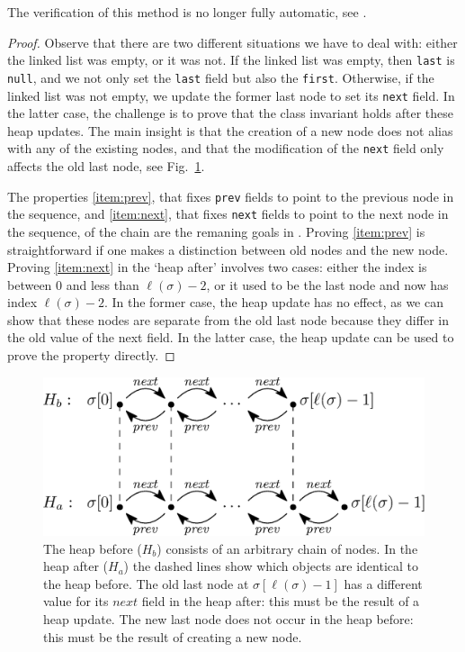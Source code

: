 \documentclass[runningheads]{llncs}
\begin{document}


The verification of this method is no longer fully automatic, see .

\begin{proof}
Observe that there are two different situations we have to deal with: either the linked list was empty, or it was not. If the linked list was empty, then \texttt{last} is \texttt{null}, and we not only set the \texttt{last} field but also the \texttt{first}. Otherwise, if the linked list was not empty, we update the former last node to set its \texttt{next} field. In the latter case, the challenge is to prove that the class invariant holds after these heap updates. The main insight is that the creation of a new node does not alias with any of the existing nodes, and that the modification of the \texttt{next} field only affects the old last node, see Fig.~\ref{fig:linklast}.

The properties \ref{item:prev}, that fixes \texttt{prev} fields to point to the previous node in the sequence, and \ref{item:next}, that fixes \texttt{next} fields to point to the next node in the sequence, of the chain are the remaning goals in . Proving \ref{item:prev} is straightforward if one makes a distinction between old nodes and the new node. Proving \ref{item:next} in the `heap after' involves two cases: either the index is between $0$ and less than $\ell(\sigma)-2$, or it used to be the last node and now has index $\ell(\sigma)-2$. In the former case, the heap update has no effect, as we can show that these nodes are separate from the old last node because they differ in the old value of the next field. In the latter case, the heap update can be used to prove the property directly.
\end{proof}

\begin{figure}
   \centering
   \includegraphics[scale=0.4]{figures/linkedlist-linklast.eps}
   \caption{The heap before ($H_b$) consists of an arbitrary chain of nodes. In the heap after ($H_a$) the dashed lines show which objects are identical to the heap before. The old last node at $\sigma[\ell(\sigma)-1]$ has a different value for its $\mathit{next}$ field in the heap after: this must be the result of a heap update. The new last node does not occur in the heap before: this must be the result of creating a new node.}
   \vspace*{-6pt}
   \label{fig:linklast}
\end{figure}
\end{document}
